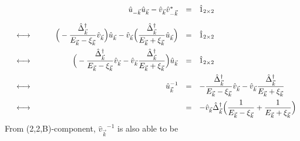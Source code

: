 \documentclass[uplatex,a4j,12pt,dvipdfmx]{jsarticle}
\begin{document}
	\begin{eqnarray}
		\begin{array}{rcrcl}
			 &   &
			\hat{u}_{-\vec{k}} \hat{u}_{\vec{k}} - \hat{v}_{\vec{k}} \hat{v}_{-\vec{k}}^{*}
			 & = &
			\hat{1}_{2 \times 2}
			\nonumber \\[4mm] &\longleftrightarrow& \hspace{8mm}
			\Big( - \dfrac{ \hat{\Delta}^{\dagger}_{\vec{k}} }{ E_{\vec{k}} - \xi_{\vec{k}} } \hat{v}_{\vec{k}} \Big)
			\hat{u}_{\vec{k}}
			-
			\hat{v}_{\vec{k}}
			\Big( \dfrac{ \hat{\Delta}^{\dagger}_{\vec{k}} }{ E_{\vec{k}} + \xi_{\vec{k}} } \hat{u}_{\vec{k}} \Big)
			 & = &
			\hat{1}_{2 \times 2}
			\nonumber \\[4mm] &\longleftrightarrow& \hspace{8mm}
			\Big(
			- \dfrac{ \hat{\Delta}^{\dagger}_{\vec{k}} }{ E_{\vec{k}} - \xi_{\vec{k}} } \hat{v}_{\vec{k}}
			-
			\hat{v}_{\vec{k}}
			\dfrac{ \hat{\Delta}^{\dagger}_{\vec{k}} }{ E_{\vec{k}} + \xi_{\vec{k}} }
			\Big)
			\hat{u}_{\vec{k}}
			 & = &
			\hat{1}_{2 \times 2}
			\nonumber \\[4mm] &\longleftrightarrow& \hspace{8mm}
			{\hat{u}_{\vec{k}}}^{-1}
			 & = &
			- \dfrac{ \hat{\Delta}^{\dagger}_{\vec{k}} }{ E_{\vec{k}} - \xi_{\vec{k}} } \hat{v}_{\vec{k}}
			-
			\hat{v}_{\vec{k}}
			\dfrac{ \hat{\Delta}^{\dagger}_{\vec{k}} }{ E_{\vec{k}} + \xi_{\vec{k}} }
			\nonumber \\[4mm] &\longleftrightarrow& \hspace{8mm}
			 & = &
			- \hat{v}_{\vec{k}} \hat{\Delta}^{\dagger}_{\vec{k}}
			\Big(
			\dfrac{ 1 }{ E_{\vec{k}} - \xi_{\vec{k}} }
			+
			\dfrac{ 1 }{ E_{\vec{k}} + \xi_{\vec{k}} }
			\Big)
		\end{array}
	\end{eqnarray}
	From (2,2,B)-component, ${\hat{v}_{\vec{k}}}^{-1}$ is also able to be
\end{document}
